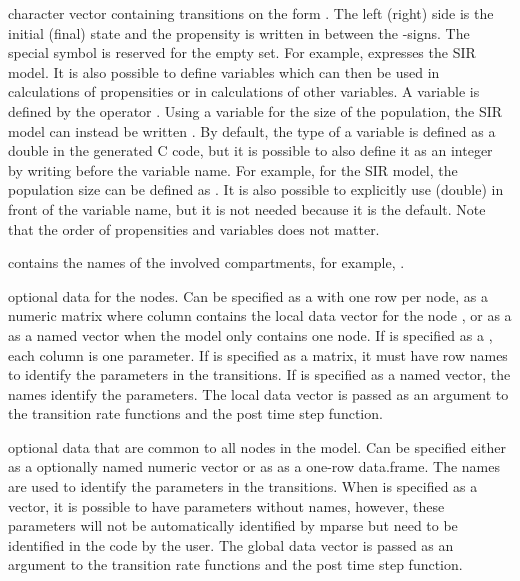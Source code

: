 \documentclass[letterpaper]{book}
\begin{document}
%
\begin{Arguments}
\begin{ldescription}
\item[\code{transitions}] character vector containing transitions on the
form . The left (right) side is the
initial (final) state and the propensity is written in between
the \code{->}-signs. The special symbol  is reserved
for the empty set. For example, 
expresses the SIR model. It is also possible to define
variables which can then be used in calculations of
propensities or in calculations of other variables. A variable
is defined by the operator \code{<-}. Using a variable for the
size of the population, the SIR model can instead be written
. By default, the type of a
variable is defined as a double in the generated C code, but
it is possible to also define it as an integer by writing
 before the variable name. For example, for the
SIR model, the population size can be defined as
. It is also possible to explicitly
use (double) in front of the variable name, but it is not
needed because it is the default. Note that the order of
propensities and variables does not matter.

\item[\code{compartments}] contains the names of the involved
compartments, for example, .

\item[\code{ldata}] optional data for the nodes. Can be specified as a
 with one row per node, as a numeric matrix
where column  contains the local data vector
for the node , or as a as a named vector when the
model only contains one node. If  is specified as
a , each column is one parameter. If
 is specified as a matrix, it must have row names to
identify the parameters in the transitions. If  is
specified as a named vector, the names identify the
parameters. The local data vector is passed as an argument to
the transition rate functions and the post time step function.

\item[\code{gdata}] optional data that are common to all nodes in the
model. Can be specified either as a optionally named numeric
vector or as as a one-row data.frame. The names are used to
identify the parameters in the transitions. When 
is specified as a vector, it is possible to have parameters
without names, however, these parameters will not be
automatically identified by mparse but need to be identified
in the code by the user. The global data vector is passed as
an argument to the transition rate functions and the post time
step function.


\end{ldescription}
\end{Arguments}
\end{document}
